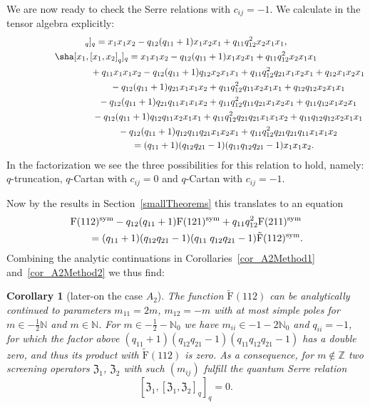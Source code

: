 \documentclass[pdftex]{sigma}%
\numberwithin{equation}{section}
\newtheorem{cor}[teo]{Corollary}
\newcommand{\N}{\mathbb{N}}
\newcommand{\Z}{\mathbb{Z}}
\newcommand{\zem}{\mathfrak{Z}}
\newcommand{\Fp}{\mathrm{F}}
\newcommand{\rFp}{\tilde{\mathrm{F}}}
\begin{document}
We are now ready to check the Serre relations with $c_{ij}=-1$. We calculate in the tensor algebra explicitly:
\begin{gather*}
[x_1,[x_1,x_2]_q]_q=x_1x_1x_2-q_{12}(q_{11}+1)x_1x_2x_1+q_{11}q_{12}^2 x_2x_1x_1, \\
 \sha [x_1,[x_1,x_2]_q]_q =x_1x_1x_2 -q_{12}(q_{11}+1)  x_1x_2x_1+q_{11}q_{12}^2  x_2x_1x_1 \\
\hphantom{\sha [x_1,[x_1,x_2]_q]_q =}{}
+q_{11}x_1x_1x_2 -q_{12}(q_{11}+1) q_{12} x_2x_1x_1+ q_{11}q_{12}^2  q_{21}x_1x_2x_1+q_{12}x_1x_2x_1 \\
\hphantom{\sha [x_1,[x_1,x_2]_q]_q =}{}
-q_{12}(q_{11}+1)  q_{21}x_1x_1x_2 +q_{11}q_{12}^2  q_{11}x_2x_1x_1+q_{12}q_{12}x_2x_1x_1 \\
\hphantom{\sha [x_1,[x_1,x_2]_q]_q =}{}
-q_{12}(q_{11}+1) q_{21}q_{11}x_1x_1x_2+q_{11}q_{12}^2  q_{11}q_{21}x_1x_2x_1+q_{11}q_{12}x_1x_2x_1 \\
\hphantom{\sha [x_1,[x_1,x_2]_q]_q =}{}
-q_{12}(q_{11}+1) q_{12}q_{11} x_2x_1x_1+ q_{11}q_{12}^2  q_{21}q_{21} x_1x_1x_2+q_{11}q_{12}q_{12}x_2x_1x_1 \\
\hphantom{\sha [x_1,[x_1,x_2]_q]_q =}{}
-q_{12}(q_{11}+1) q_{12}q_{11}q_{21} x_1x_2x_1+ q_{11}q_{12}^2  q_{21}q_{21}q_{11} x_1x_1x_2 \\
\hphantom{\sha [x_1,[x_1,x_2]_q]_q }{}
=(q_{11}+1)(q_{12}q_{21}-1)(q_{11} q_{12}q_{21}-1)x_1x_1x_2.
\end{gather*}
In the factorization we see the three possibilities for this relation to hold, namely: $q$-truncation, $q$-Cartan with $c_{ij}=0$ and $q$-Cartan with $c_{ij}=-1$.

Now by the results in Section~\ref{smallTheorems} this translates to an equation
\begin{gather*}
 \Fp(112)^{{\rm sym}}-q_{12}(q_{11}+1)\Fp(121)^{{\rm sym}}+q_{11}q_{12}^2 \Fp(211)^{{\rm sym}}\\
\qquad{} =(q_{11}+1)(q_{12}q_{21}-1)(q_{11}\;q_{12}q_{21}-1)\rFp(112)^{{\rm sym}}.
\end{gather*}
Combining the analytic continuations in Corollaries~\ref{cor_A2Method1} and~\ref{cor_A2Method2} we thus find:

\begin{cor}[later-on the case $A_2$]\label{cor_A2}
The function $\rFp(112)$ can be analytically continued to parameters $m_{11}=2m$, $m_{12}=-m$ with at most simple poles for $m\in-\frac{1}{2}\N$ and $m\in\N$. For $m\in-\frac{1}{2}-\N_0$ we have $m_{ii}\in -1-2\N_0$ and $q_{ii}=-1$, for which the factor above $(q_{11}+1)(q_{12}q_{21}\allowbreak -1)(q_{11} q_{12}q_{21}-1)$ has a double zero, and thus its product with $\rFp(112)$ is zero. As a consequence, for $m\not\in \Z$ two screening operators $\zem_1$, $\zem_2$ with such $(m_{ij})$ fulfill the quantum Serre relation
\[[\zem_1,[\zem_1,\zem_2]_q]_q=0.\]
\end{cor}
\end{document}
